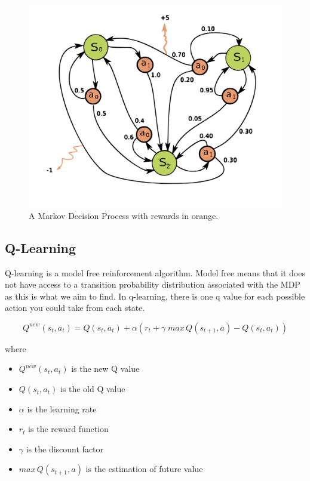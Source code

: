 \documentclass[]{article}
\begin{document}
\begin{figure}[H]
	\includegraphics[scale=0.20]{mdp}
	\centering
	\caption{A Markov Decision Process with rewards in orange.}
\end{figure}

\subsection{Q-Learning}

Q-learning is a model free reinforcement algorithm. Model free means that it does not have access to a transition probability distribution associated with the MDP as this is what we aim to find. In q-learning, there is one q value for each possible action you could take from each state.

\[Q^{new}(s_t,a_t) = Q(s_t,a_t)+\alpha(r_t+\gamma \; max \, Q(s_{t+1},a) - Q(s_t,a_t))  \]

where 
\begin{itemize}
	\itemsep-0.4em 
	\item $Q^{new}(s_t,a_t)$ is the new Q value
	\item $Q(s_t,a_t)$ is the old Q value
	\item $\alpha$ is the learning rate
	\item $r_t$ is the reward function
	\item $\gamma$ is the discount factor
	\item $max \, Q(s_{t+1},a)$ is the estimation of future value
	
\end{itemize}
\end{document}

